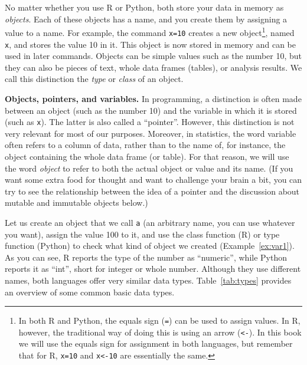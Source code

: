 No matter whether you use R or Python, both store your data in memory as \emph{objects}.
Each of these objects has a name, and you create them by
assigning a value to a name. For example, the command \verb|x=10|
creates a new object\footnote{In both R and Python, the equals
  sign (\verb|=|) can be used to assign values. In R, however, the
  traditional way of doing this is using an arrow (\verb|<-|). In
  this book we will use the equals sign for assignment in both
  languages, but remember that for R, \verb|x=10| and
  \verb|x<-10| are essentially the same.}, named \texttt{x}, and stores the value 10
in it.  This object is now stored in memory and can be used in later
commands. Objects can be simple values such as the number 10, but they can also
be pieces of text, whole data frames (tables), or analysis results.
We call this distinction the \emph{type} or \emph{class} of an
object. 

\begin{feature}
\textbf{Objects, pointers, and variables.} In programming, a distinction is
  often made between an object (such as the number 10) and the
  variable in which it is stored (such as \texttt{x}). The latter is also called a ``pointer''.
  However, this distinction is not very relevant for most of our
  purposes. Moreover, in statistics, the word variable often refers to a
  column of data, rather than to the name of, for instance, the object
  containing the whole data frame (or table).  For that
  reason, we will use the word \emph{object} to refer to both the
  actual object or value and its name. (If you want some extra food
  for thought and want to challenge your brain
  a bit, you can try to see the relationship between the idea of a pointer and
  the discussion about mutable and immutable objects below.)
\end{feature}

Let us create an object that we call \verb|a| (an arbitrary name, you can use
whatever you want), assign the value 100 to it, and use the class
function (R) or type function (Python) to check what kind of
object we created (Example~\ref{ex:var1}).
As you can see, R reports the type of the number as ``numeric'', while Python reports it
as ``int'', short for integer or whole number.  Although they use
different names, both languages offer very similar data types.
Table~\ref{tab:types} provides an overview of some common basic data types.


